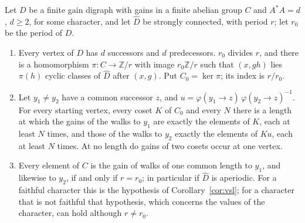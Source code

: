 \begin{proposition}[Abundance]\label{prop:abund}
Let $D$ be a finite gain digraph with gains in a finite abelian group $C$ and $A^*A=d$, $d\ge2$, for some character, and let $\hat D$ be strongly connected, with period $r$; let $r_0$ be the period of $D$.
\begin{enumerate}[label=(\alph*)]
\item Every vertex of $D$ has $d$ successors and $d$ predecessors. $r_0$ divides $r$, and there is a homomorphism $\pi\colon C\to\mathbb{Z}/r$ with image $r_0\mathbb{Z}/r$ such that $(x,gh)$ lies $\pi(h)$ cyclic classes of $\hat D$ after $(x,g)$. Put $C_0=\ker\pi$; its index is $r/r_0$.
\item Let $y_1\ne y_2$ have a common successor $z$, and $u=\varphi(y_1\to z)\,\varphi(y_2\to z)^{-1}$. For every starting vertex, every coset $K$ of $C_0$ and every $N$ there is a length at which the gains of the walks to $y_1$ are exactly the elements of $K$, each at least $N$ times, and those of the walks to $y_2$ exactly the elements of $Ku$, each at least $N$ times. At no length do gains of two cosets occur at one vertex.
\item Every element of $C$ is the gain of walks of one common length to $y_1$, and likewise to $y_2$, if and only if $r=r_0$; in particular if $\hat D$ is aperiodic. For a faithful character this is the hypothesis of Corollary~\ref{cor:vsl}; for a character that is not faithful that hypothesis, which concerns the values of the character, can hold although $r\ne r_0$.
\end{enumerate}
\end{proposition}
